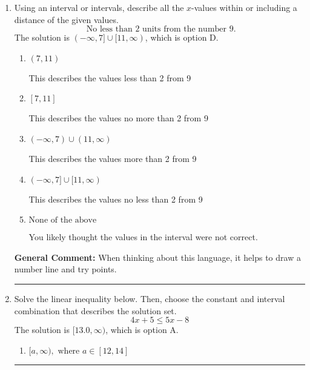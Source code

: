 \documentclass{extbook}[14pt]
\newcommand{\litem}[1]{\item #1

\rule{\textwidth}{0.4pt}}
\begin{document}
\begin{enumerate}
{\begin{enumerate}[label=\Alph*.]
 $(-\infty, -1.714)$, which corresponds to switching the direction of the interval AND negating the endpoint. You likely did this if you did not flip the inequality when dividing by a negative as well as not moving values over to a side properly.
\item \( (a, \infty), \text{ where } a \in [1.71, 6.71] \)

* $(1.714, \infty)$, which is the correct option.
\item \( \text{None of the above}. \)

You may have chosen this if you thought the inequality did not match the ends of the intervals.
\end{enumerate}

\textbf{General Comment:} Remember that less/greater than or equal to includes the endpoint, while less/greater do not. Also, remember that you need to flip the inequality when you multiply or divide by a negative.
}
\litem{
Using an interval or intervals, describe all the $x$-values within or including a distance of the given values.
\[ \text{ No less than } 2 \text{ units from the number } 9. \]The solution is \( (-\infty, 7] \cup [11, \infty) \), which is option D.\begin{enumerate}[label=\Alph*.]
\item \( (7, 11) \)

This describes the values less than 2 from 9
\item \( [7, 11] \)

This describes the values no more than 2 from 9
\item \( (-\infty, 7) \cup (11, \infty) \)

This describes the values more than 2 from 9
\item \( (-\infty, 7] \cup [11, \infty) \)

This describes the values no less than 2 from 9
\item \( \text{None of the above} \)

You likely thought the values in the interval were not correct.
\end{enumerate}

\textbf{General Comment:} When thinking about this language, it helps to draw a number line and try points.
}
\litem{
Solve the linear inequality below. Then, choose the constant and interval combination that describes the solution set.
\[ 4x + 5 \leq 5x -8 \]The solution is \( [13.0, \infty) \), which is option A.\begin{enumerate}[label=\Alph*.]
\item \( [a, \infty), \text{ where } a \in [12, 14] \)


\end{enumerate}}
\end{enumerate}
\end{document}
